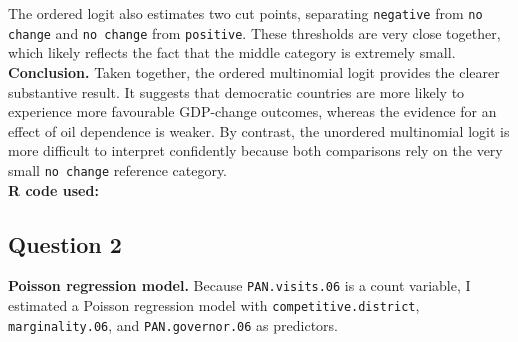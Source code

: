 \documentclass[12pt,letterpaper]{article}
\begin{document}
\noindent The ordered logit also estimates two cut points, separating \texttt{negative} from \texttt{no change} and \texttt{no change} from \texttt{positive}. These thresholds are very close together, which likely reflects the fact that the middle category is extremely small.\\

\noindent \textbf{Conclusion.}
Taken together, the ordered multinomial logit provides the clearer substantive result. It suggests that democratic countries are more likely to experience more favourable GDP-change outcomes, whereas the evidence for an effect of oil dependence is weaker. By contrast, the unordered multinomial logit is more difficult to interpret confidently because both comparisons rely on the very small \texttt{no change} reference category.\\

\noindent\textbf{R code used:}


\newpage

\subsection*{Question 2}

\textbf{Poisson regression model.}
Because \texttt{PAN.visits.06} is a count variable, I estimated a Poisson regression model with \texttt{competitive.district}, \texttt{marginality.06}, and \texttt{PAN.governor.06} as predictors.
\end{document}
